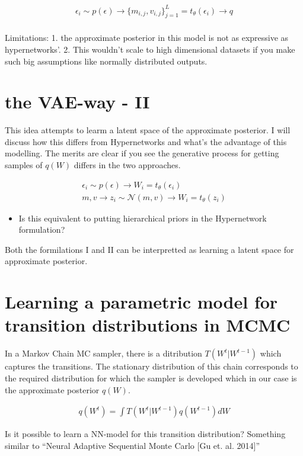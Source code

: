 \documentclass[twoside]{article}
\begin{document}
\begin{align}
\epsilon_i \sim p(\epsilon) \rightarrow \{m_{i,j},v_{i,j}\}_{j=1}^{L} = t_\theta(\epsilon_i) \rightarrow q\\
\end{align}

Limitations: 1. the approximate posterior in this model is not as expressive as hypernetworks'. 2. This wouldn't scale to high dimensional datasets if you make such big assumptions like normally distributed outputs. 

\section{the VAE-way - II}

This idea attempts to learm a latent space of the approximate posterior. I will discuss how this differs from Hypernetworks and what's the advantage of this modelling. The merits are clear if you see the generative process for getting samples of $q(W)$ differs in the two approaches. 

\begin{align}
\epsilon_i \sim p(\epsilon) \rightarrow W_i = t_\theta(\epsilon_i)\\
m,v \rightarrow z_i \sim \mathcal{N}(m,v) \rightarrow W_i = t_\theta(z_i)
\end{align}

\begin{itemize}
  \item Is this equivalent to putting hierarchical priors in the Hypernetwork formulation? 
\end{itemize}

Both the formilations I and II can be interpretted as learning a latent space for approximate posterior. 

 
\section{Learning a parametric model for transition distributions in MCMC}

In a Markov Chain MC sampler, there is a ditribution $T(W^{t}|W^{t-1})$ which captures the transitions. The stationary distribution of this chain corresponds to the required distribution for which the sampler is developed which in our case is the approximate posterior $q(W)$. 

\begin{align}
q(W^t) = \int T(W^{t}|W^{t-1})q(W^{t-1})dW
\end{align}

Is it possible to learn a NN-model for this transition distribution? Something similar to ``Neural Adaptive Sequential Monte Carlo [Gu et. al. 2014]''



%
%
\end{document}

